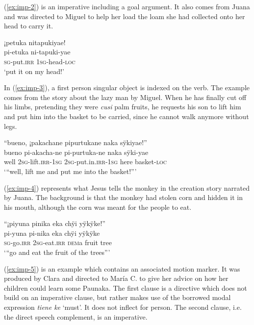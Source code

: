 (\ref{ex:imp-2}) is an imperative including a goal argument. It also comes from Juana and was directed to Miguel to help her load the loam she had collected onto her head to carry it.

\ea\label{ex:imp-2}
\begingl
\glpreamble ¡petuka nitapukiyae!\\
\gla pi-etuka ni-tapuki-yae\\
\textsc{sg}-put.\textsc{irr} 1\textsc{sg}-head-\textsc{loc}\\
\glft ‘put it on my head!’
\endgl
\trailingcitation{[jmx-d110918ls-1.110]}
\xe

In (\ref{ex:imp-3}), a first person singular object is indexed on the verb. The example comes from the story about the lazy man by Miguel. When he has finally cut off his limbs, pretending they were \textit{cusi} palm fruits, he requests his son to lift him and put him into the basket to be carried, since he cannot walk anymore without legs.

\ea\label{ex:imp-3}
\begingl
\glpreamble “bueno, ¡pakachane pipurtukane naka sÿkiyae!”\\
\gla bueno pi-akacha-ne pi-purtuka-ne naka sÿki-yae\\
\glb well 2\textsc{sg}-lift.\textsc{irr}-1\textsc{sg} 2\textsc{sg}-put.in.\textsc{irr}-1\textsc{sg} here basket-\textsc{loc}\\
\glft ‘“well, lift me and put me into the basket!”’
\endgl
\trailingcitation{[mox-n110920l.118]}
\xe

(\ref{ex:imp-4}) represents what Jesus tells the monkey in the creation story narrated by Juana. The background is that the monkey had stolen corn and hidden it in his mouth, although the corn was meant for the people to eat.

\ea\label{ex:imp-4}
\begingl
\glpreamble “¡piyuna pinika eka chÿi yÿkÿke!”\\
\gla pi-yuna pi-nika eka chÿi yÿkÿke\\
\textsc{sg}-go.\textsc{irr} 2\textsc{sg}-eat.\textsc{irr} \textsc{dem}a fruit tree\\
\glft ‘“go and eat the fruit of the trees”’
\endgl
\trailingcitation{[jxx-n101013s-1.873]}
\xe

(\ref{ex:imp-5}) is an example which contains an associated motion marker. It was produced by Clara and directed to María C. to give her advice on how her children could learn some Paunaka. The first clause is a directive which does not build on an imperative clause, but rather makes use of the borrowed modal expression \textit{tiene ke} ‘must’. It does not inflect for person. The second clause, i.e. the direct speech complement, is an imperative.

